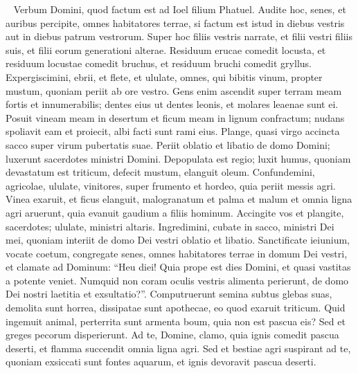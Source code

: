
\begin{biblechapter}   
\verse Verbum Domini, quod factum est ad Ioel filium Phatuel. 
\verse Audite hoc, senes, et auribus percipite, omnes habitatores terrae, si factum est istud in diebus vestris aut in diebus patrum vestrorum. 
\verse Super hoc filiis vestris narrate, et filii vestri filiis suis, et filii eorum generationi alterae. 
\verse Residuum erucae comedit locusta, et residuum locustae comedit bruchus, et residuum bruchi comedit gryllus. 
\verse Expergiscimini, ebrii, et flete, et ululate, omnes, qui bibitis vinum, propter mustum, quoniam periit ab ore vestro. 
\verse Gens enim ascendit super terram meam fortis et innumerabilis; dentes eius ut dentes leonis, et molares leaenae sunt ei. 
\verse Posuit vineam meam in desertum et ficum meam in lignum confractum; nudans spoliavit eam et proiecit, albi facti sunt rami eius. 
\verse Plange, quasi virgo accincta sacco super virum pubertatis suae. 
\verse Periit oblatio et libatio de domo Domini; luxerunt sacerdotes ministri Domini. 
\verse Depopulata est regio; luxit humus, quoniam devastatum est triticum, defecit mustum, elanguit oleum. 
\verse Confundemini, agricolae, ululate, vinitores, super frumento et hordeo, quia periit messis agri. 
\verse Vinea exaruit, et ficus elanguit, malogranatum et palma et malum et omnia ligna agri aruerunt, quia evanuit gaudium a filiis hominum. 
\verse Accingite vos et plangite, sacerdotes; ululate, ministri altaris. Ingredimini, cubate in sacco, ministri Dei mei, quoniam interiit de domo Dei vestri oblatio et libatio. 
\verse Sanctificate ieiunium, vocate coetum, congregate senes, omnes habitatores terrae in domum Dei vestri, et clamate ad Dominum: 
\verse “Heu diei! Quia prope est dies Domini, et quasi vastitas a potente veniet. 
\verse Numquid non coram oculis vestris alimenta perierunt, de domo Dei nostri laetitia et exsultatio?”. 
\verse Computruerunt semina subtus glebas suas, demolita sunt horrea, dissipatae sunt apothecae, eo quod exaruit triticum. 
\verse Quid ingemuit animal, perterrita sunt armenta boum, quia non est pascua eis? Sed et greges pecorum disperierunt. 
\verse Ad te, Domine, clamo, quia ignis comedit pascua deserti, et flamma succendit omnia ligna agri. 
\verse Sed et bestiae agri suspirant ad te, quoniam exsiccati sunt fontes aquarum, et ignis devoravit pascua deserti. 
\end{biblechapter}

